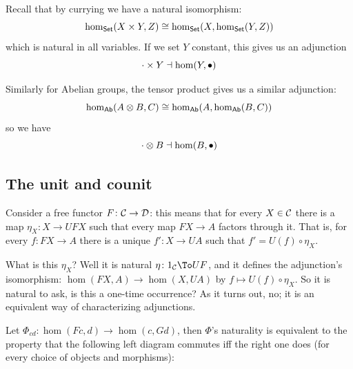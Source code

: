 \eexam

Recall that by currying we have a natural isomorphism:
$$ \hom_{\sf Set}(X\times Y,Z) \cong \hom_{\sf Set}(X,\hom_{\sf Set}(Y,Z)) $$
which is natural in all variables.
If we set $Y$ constant, this gives us an adjunction
$$ \cdot\times Y\dashv\hom(Y,\bullet) $$

Similarly for Abelian groups, the tensor product gives us a similar adjunction:
$$ \hom_{\sf Ab}(A\otimes B,C) \cong \hom_{\sf Ab}(A,\hom_{\sf Ab}(B,C)) $$
so we have
$$ \cdot\otimes B\dashv\hom(B,\bullet) $$

\subsection{The unit and counit}

Consider a free functor $F\colon{{\cal C}}\to{{\cal D}}$: this means that for every $X\in{{\cal C}}$ there is a map $\eta_X\colon X\to UFX$ such that every map $FX\to A$ factors through it.
That is, for every $f\colon FX\to A$ there is a unique $f'\colon X\to UA$ such that $f'=U(f)\circ\eta_X$.

What is this $\eta_X$?
Well it is natural $\eta\colon 1_\C\To UF$, and it defines the adjunction's isomorphism: $\hom(FX,A)\to\hom(X,UA)$ by $f\mapsto U(f)\circ\eta_X$.
So it is natural to ask, is this a one-time occurrence?
As it turns out, no; it is an equivalent way of characterizing adjunctions.

\blemm

    Let $\Phi_{cd}\colon\hom(Fc,d)\to\hom(c,Gd)$, then $\Phi$'s naturality is equivalent to the property that the following left diagram commutes iff the right one does (for every choice
    of objects and morphisms):
    
    \hbox{\hfil{}\hfil{}\hfil}

\elemm

